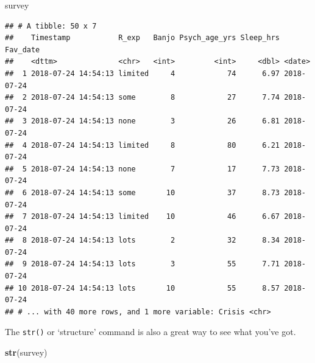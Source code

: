 \documentclass[]{article}
\newenvironment{Shaded}{\begin{snugshade}}{\end{snugshade}}
\newcommand{\KeywordTok}[1]{\textcolor[rgb]{0.13,0.29,0.53}{\textbf{#1}}}
\newcommand{\NormalTok}[1]{#1}
\begin{document}
\begin{Shaded}
\begin{Highlighting}[]
\NormalTok{survey}
\end{Highlighting}
\end{Shaded}

\begin{verbatim}
## # A tibble: 50 x 7
##    Timestamp           R_exp   Banjo Psych_age_yrs Sleep_hrs Fav_date  
##    <dttm>              <chr>   <int>         <int>     <dbl> <date>    
##  1 2018-07-24 14:54:13 limited     4            74      6.97 2018-07-24
##  2 2018-07-24 14:54:13 some        8            27      7.74 2018-07-24
##  3 2018-07-24 14:54:13 none        3            26      6.81 2018-07-24
##  4 2018-07-24 14:54:13 limited     8            80      6.21 2018-07-24
##  5 2018-07-24 14:54:13 none        7            17      7.73 2018-07-24
##  6 2018-07-24 14:54:13 some       10            37      8.73 2018-07-24
##  7 2018-07-24 14:54:13 limited    10            46      6.67 2018-07-24
##  8 2018-07-24 14:54:13 lots        2            32      8.34 2018-07-24
##  9 2018-07-24 14:54:13 lots        3            55      7.71 2018-07-24
## 10 2018-07-24 14:54:13 lots       10            55      8.57 2018-07-24
## # ... with 40 more rows, and 1 more variable: Crisis <chr>
\end{verbatim}

The \texttt{str()} or `structure' command is also a great way to see
what you've got.

\begin{Shaded}
\begin{Highlighting}[]
\KeywordTok{str}\NormalTok{(survey)}
\end{Highlighting}
\end{Shaded}
\end{document}
